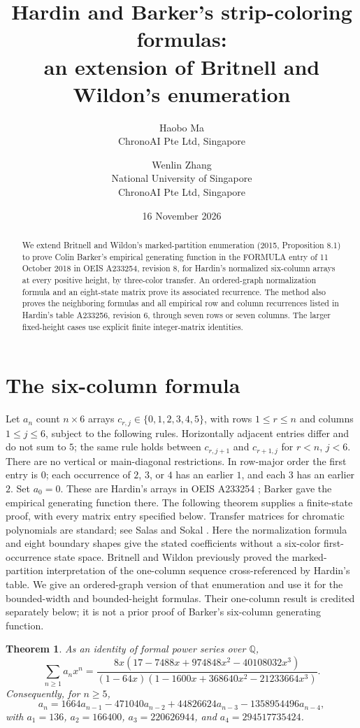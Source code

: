 \documentclass[11pt]{article}
\title{Hardin and Barker's strip-coloring formulas:\\
an extension of Britnell and Wildon's enumeration}
\author{Haobo Ma\\\small ChronoAI Pte Ltd, Singapore
\and Wenlin Zhang\\\small National University of Singapore\\\small ChronoAI Pte Ltd, Singapore}
\date{16 November 2026}
\newtheorem{theorem}{Theorem}
\begin{document}
\maketitle
\begin{abstract}
We extend Britnell and Wildon's marked-partition enumeration (2015,
Proposition 8.1) to prove Colin Barker's empirical generating function in
the FORMULA entry of 11 October 2018 in OEIS A233254, revision 8, for Hardin's
normalized six-column arrays at every positive height, by three-color transfer.
An ordered-graph normalization formula and an eight-state matrix prove its
associated recurrence. The method also proves the neighboring formulas and
all empirical row and column recurrences listed in Hardin's table A233256,
revision 6, through seven rows or seven columns.
The larger fixed-height cases use explicit finite integer-matrix identities.
\end{abstract}

\section{The six-column formula}
Let $a_n$ count $n\times6$ arrays $c_{r,j}\in\{0,1,2,3,4,5\}$, with
rows $1\le r\le n$ and columns $1\le j\le6$, subject to the following rules.
Horizontally adjacent entries differ and do not sum to $5$; the same rule
holds between $c_{r,j+1}$ and $c_{r+1,j}$ for $r<n$, $j<6$.
There are no vertical or main-diagonal restrictions.
In row-major order the first entry is $0$; each occurrence of $2$, $3$, or $4$
has an earlier $1$, and each $3$ has an earlier $2$.
Set $a_0=0$.
These are Hardin's arrays in OEIS A233254 \cite{six}; Barker gave the
empirical generating function there. The following theorem supplies a
finite-state proof, with every matrix entry specified below.
Transfer matrices for chromatic polynomials are standard; see
Salas and Sokal \cite[Section 3.1]{salas}.
Here the normalization formula and eight boundary shapes give the stated
coefficients without a six-color first-occurrence state space.
Britnell and Wildon \cite[Proposition 8.1 and Section 6.3]{britnell}
previously proved the marked-partition interpretation of the one-column
sequence cross-referenced by Hardin's table. We give an ordered-graph version
of that enumeration and use it for the bounded-width and bounded-height
formulas. Their one-column result is credited separately below; it is not
a prior proof of Barker's six-column generating function.

\begin{theorem}\label{thm:main}
As an identity of formal power series over $\mathbb Q$,
\begin{equation}\label{eq:gf}
\sum_{n\ge1}a_nx^n=
\frac{8x(17-7488x+974848x^2-40108032x^3)}
{(1-64x)(1-1600x+368640x^2-21233664x^3)}.
\end{equation}
Consequently, for $n\ge5$,
\begin{equation}\label{eq:rec}
a_n=1664a_{n-1}-471040a_{n-2}+44826624a_{n-3}-1358954496a_{n-4},
\end{equation}
with $a_1=136$, $a_2=166400$, $a_3=220626944$, and $a_4=294517735424$.
\end{theorem}
\end{document}

